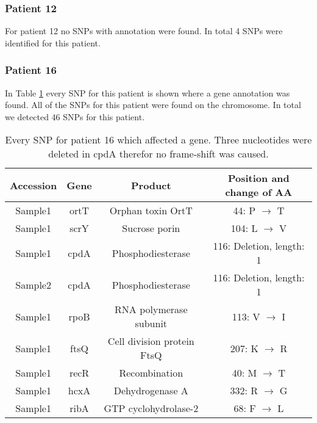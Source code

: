 \subsubsection{Patient 12}
For patient 12 no SNPs with annotation were found. In total 4 SNPs were identified for this patient.

\subsubsection{Patient 16}
In Table \ref{table:pat16_snp_annotated} every SNP for this patient is shown where a gene annotation was found. All of the SNPs for this patient were found on the chromosome. In total we detected 46 SNPs for this patient. 

\begin{table}[H]
	\begin{tabular}{|c c c c|}	
		\hline
		Accession & Gene & Product & Position and change of AA \\ [0.5ex]
		\hline\hline
		Sample1   & ortT & Orphan toxin OrtT          & 44: P $\rightarrow$ T               \\
		\hline
		Sample1   & scrY & Sucrose porin              & 104: L $\rightarrow$ V              \\
		\hline
		Sample1   & cpdA & Phosphodiesterase          & 116: Deletion, length: 1			\\
		\hline
		Sample2   & cpdA & Phosphodiesterase          & 116: Deletion, length: 1  			\\
		\hline
		Sample1   & rpoB & RNA polymerase subunit     & 113: V $\rightarrow$ I              \\
		\hline
		Sample1   & ftsQ & Cell division protein FtsQ & 207: K $\rightarrow$ R              \\
		\hline
		Sample1   & recR & Recombination              & 40: M $\rightarrow$ T               \\
		\hline
		Sample1   & hcxA & Dehydrogenase A            & 332: R $\rightarrow$ G             \\
		\hline
		Sample1   & ribA & GTP cyclohydrolase-2       & 68: F $\rightarrow$ L              \\ 
		\hline
	\end{tabular}
	\caption{Every SNP for patient 16 which affected a gene. Three nucleotides were deleted in cpdA therefor no frame-shift was caused.}
	\label{table:pat16_snp_annotated}
\end{table}	

